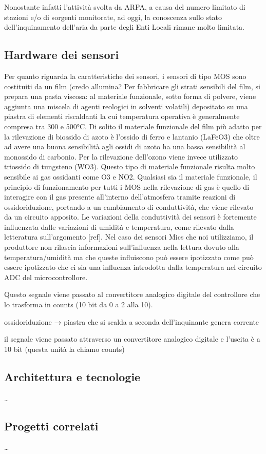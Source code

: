 Nonostante infatti l’attività svolta da ARPA, a causa del numero limitato di stazioni e/o di sorgenti monitorate, ad oggi, la conoscenza sullo stato dell’inquinamento dell’aria da parte degli Enti Locali rimane molto limitata.

\subsection{Hardware dei sensori}\label{ssec:hardware}
Per quanto riguarda la caratteristiche dei sensori, i sensori di tipo MOS sono costituiti da un film (credo allumina? Per  fabbricare  gli  strati  sensibili  del  film,  si  prepara  una  pasta  viscosa:  al  materiale funzionale,  sotto  forma  di  polvere,  viene  aggiunta  una  miscela  di  agenti  reologici  in  solventi  volatili) depositato su una piastra di elementi riscaldanti la cui temperatura operativa è generalmente compresa tra 300 e 500°C. Di solito il  materiale funzionale del film più  adatto per  la  rilevazione di  biossido  di  azoto è l’ossido  di  ferro  e lantanio (LaFeO3) che oltre ad avere una buona sensibilità agli ossidi di azoto ha una  bassa  sensibilità  al  monossido  di  carbonio. Per la rilevazione dell’ozono viene invece utilizzato  triossido di tungsteno (WO3). Questo tipo  di  materiale  funzionale risulta  molto  sensibile  ai  gas  ossidanti  come  O3 e  NO2. Qualsiasi sia il materiale funzionale, il principio di funzionamento per tutti i MOS nella rilevazione di gas è quello di interagire con il gas presente all’interno dell’atmosfera tramite reazioni di ossidoriduzione, portando a un cambiamento di conduttività, che viene rilevato da un circuito apposito. Le variazioni della conduttività dei sensori è fortemente influenzata dalle variazioni di umidità e temperatura, come rilevato dalla letteratura sull'argomento [ref]. Nel caso dei sensori Mics che noi utilizziamo, il produttore non rilascia informazioni sull'influenza nella lettura dovuto alla temperatura/umidità  ma che queste influiscono può essere ipotizzato come può essere ipotizzato che ci sia una influenza introdotta dalla temperatura nel circuito ADC del microcontrollore.

Questo segnale viene passato al convertitore analogico digitale del controllore che lo trasforma in counts (10 bit da 0 a 2 alla 10).

ossidoriduzione → piastra che si scalda a seconda dell'inquinante genera corrente

il segnale viene passato attraverso un convertitore analogico digitale e l’uscita è a 10 bit (questa unità la chiamo counts)


\subsection{Architettura e tecnologie}\label{ssec:airqino-architettura}
\ldots

\subsection{Progetti correlati}\label{ssec:correlati}
\ldots